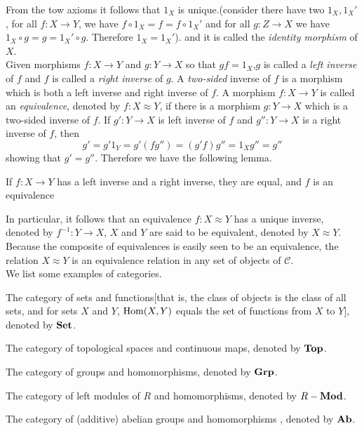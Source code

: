 \documentclass{article}
\begin{document}
From the tow axioms it follows that $1_X$ is unique.(consider there have two $1_X,1_X'$, for all $f : X \to Y$, we have $f \circ 1_X = f = f \circ 1_{X}'$ and for all $g : Z \to X$ we have $1_X \circ g = g = 1_X' \circ g$. Therefore $1_X = 1_X'$). and it is called the \emph{identity morphism} of $X$.\\
Given morphisms $f : X \to Y$ and $g : Y \to X$ so that $gf = 1_X$,$g$ is called a \emph{left inverse} of $f$ and $f$ is called a \emph{right inverse} of $g$. A \emph{two-sided} inverse of $f$ is a morphism which is both a left inverse and right inverse of $f$. A morphism $f : X \to Y$ is called an \emph{equivalence}, denoted by $f : X \approx Y$, if there is a morphism $g : Y \to X$ which is a two-sided inverse of $f$. If $g' : Y \to X$ is left inverse of $f$ and $g'' : Y \to X$ is a right inverse of $f$, then
$$
g' = g'1_Y = g'(fg'') = (g'f) g'' = 1_X g'' = g''
$$
showing that $g' = g''$. Therefore we have the following lemma.
\begin{lemma}
    If $f: X \to Y$ has a left inverse and a right inverse, they are equal, and $f$ is an equivalence
\end{lemma}
In particular, it follows that an equivalence $f : X \approx Y$ has a unique inverse, denoted by $f^{-1} : Y \to X$, $X$ and $Y$ are said to be equivalent, denoted by $X \approx Y$. Because the composite of equivalences is easily seen to be an equivalence, the relation $X \approx Y$ is an equivalence relation in any set of objects of $\mathscr{C}$.\\
We list some examples of categories.
\begin{example}
    The category of sets and functions[that is, the class of objects is the class of all sets, and for sets $X$ and $Y$, $\operatorname{Hom}(X,Y)$ equals the set of functions from $X$ to $Y$], denoted by $\bold{Set}$.
\end{example}
\begin{example}
    The category of topological spaces and continuous maps, denoted by $\bold{Top}$.
\end{example}
\begin{example}
    The category of groups and homomorphisms, denoted by $\bold{Grp}$.
\end{example}
\begin{example}
    The category of left modules of $R$ and homomorphisms, denoted by $R-\bold{Mod}$.
\end{example}
\begin{example}
    The category of (additive) abelian groups and homomorphisms , denoted by $\bold{Ab}$.
\end{example}
\end{document}
